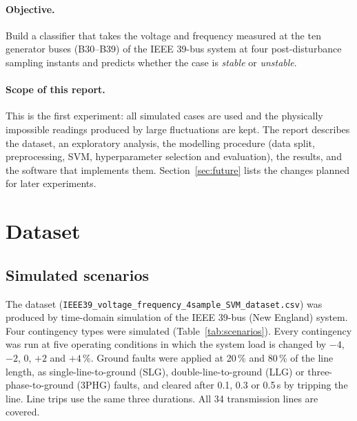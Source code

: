 \documentclass[11pt,a4paper]{article}
\newcommand{\code}[1]{\texttt{#1}}
\begin{document}
\paragraph{Objective.} Build a classifier that takes the voltage and frequency measured at the ten generator buses
(B30--B39) of the IEEE 39-bus system at four post-disturbance sampling instants and predicts whether the case is
\emph{stable} or \emph{unstable}.

\paragraph{Scope of this report.} This is the first experiment: all simulated cases are used and the physically
impossible readings produced by large fluctuations are kept. The report describes the dataset, an exploratory
analysis, the modelling procedure (data split, preprocessing, SVM, hyperparameter selection and evaluation), the
results, and the software that implements them. Section~\ref{sec:future} lists the changes planned for later
experiments.

\section{Dataset}
\subsection{Simulated scenarios}
The dataset (\code{IEEE39\_voltage\_frequency\_4sample\_SVM\_dataset.csv}) was produced by time-domain simulation of
the IEEE 39-bus (New England) system. %
Four contingency types were simulated (Table~\ref{tab:scenarios}). Every contingency was run at five operating
conditions in which the system load is changed by $-4$, $-2$, 0, $+2$ and $+4$\,\%. Ground faults were applied at
20\,\% and 80\,\% of the line length, as single-line-to-ground (SLG), double-line-to-ground (LLG) or three-phase-to-ground
(3PHG) faults, and cleared after 0.1, 0.3 or 0.5\,s by tripping the line. Line trips use the same three durations.
All 34 transmission lines are covered.
\end{document}
